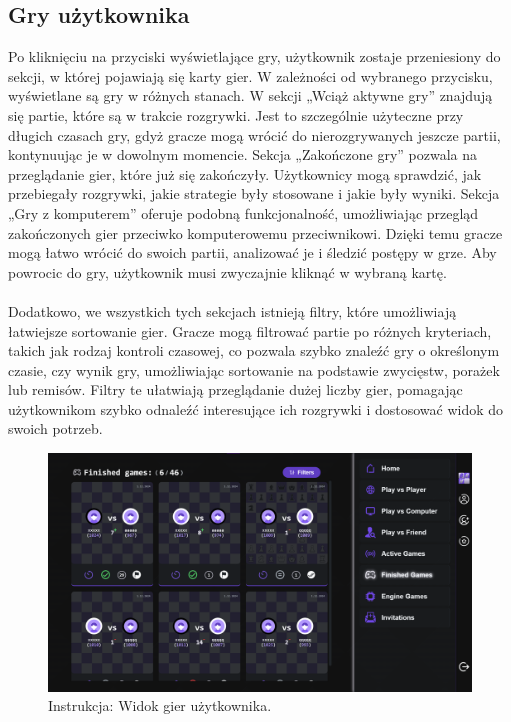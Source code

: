 \documentclass[12pt,a4paper]{article}
\begin{document}
\newpage

\subsection{Gry użytkownika}

\noindent
Po kliknięciu na przyciski wyświetlające gry, użytkownik zostaje przeniesiony do sekcji, w której pojawiają się karty gier. W zależności od wybranego przycisku, wyświetlane są gry w różnych stanach. W sekcji „Wciąż aktywne gry” znajdują się partie, które są w trakcie rozgrywki. Jest to szczególnie użyteczne przy długich czasach gry, gdyż gracze mogą wrócić do nierozgrywanych jeszcze partii, kontynuując je w dowolnym momencie. Sekcja „Zakończone gry” pozwala na przeglądanie gier, które już się zakończyły. Użytkownicy mogą sprawdzić, jak przebiegały rozgrywki, jakie strategie były stosowane i jakie były wyniki. Sekcja „Gry z komputerem” oferuje podobną funkcjonalność, umożliwiając przegląd zakończonych gier przeciwko komputerowemu przeciwnikowi. Dzięki temu gracze mogą łatwo wrócić do swoich partii, analizować je i śledzić postępy w grze. Aby powrocic do gry, użytkownik musi zwyczajnie kliknąć w wybraną kartę.
\\\\
Dodatkowo, we wszystkich tych sekcjach istnieją filtry, które umożliwiają łatwiejsze sortowanie gier. Gracze mogą filtrować partie po różnych kryteriach, takich jak rodzaj kontroli czasowej, co pozwala szybko znaleźć gry o określonym czasie, czy wynik gry, umożliwiając sortowanie na podstawie zwycięstw, porażek lub remisów. Filtry te ułatwiają przeglądanie dużej liczby gier, pomagając użytkownikom szybko odnaleźć interesujące ich rozgrywki i dostosować widok do swoich potrzeb.

\vspace{0.5cm}
\begin{figure}[h!]
    \centering
    \includegraphics[width=1\textwidth]{images/ins_min_games.png}
    \caption{Instrukcja: Widok gier użytkownika.}
\end{figure}
\end{document}

